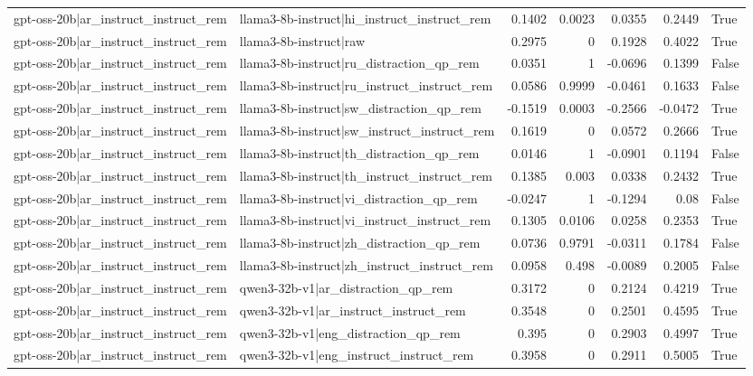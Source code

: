 \begin{table}
\begin{tabular}{l l r r r r l}
gpt-oss-20b|ar_instruct_instruct_rem & llama3-8b-instruct|hi_instruct_instruct_rem & 0.1402 & 0.0023 & 0.0355 & 0.2449 & True \\
gpt-oss-20b|ar_instruct_instruct_rem & llama3-8b-instruct|raw & 0.2975 & 0 & 0.1928 & 0.4022 & True \\
gpt-oss-20b|ar_instruct_instruct_rem & llama3-8b-instruct|ru_distraction_qp_rem & 0.0351 & 1 & -0.0696 & 0.1399 & False \\
gpt-oss-20b|ar_instruct_instruct_rem & llama3-8b-instruct|ru_instruct_instruct_rem & 0.0586 & 0.9999 & -0.0461 & 0.1633 & False \\
gpt-oss-20b|ar_instruct_instruct_rem & llama3-8b-instruct|sw_distraction_qp_rem & -0.1519 & 0.0003 & -0.2566 & -0.0472 & True \\
gpt-oss-20b|ar_instruct_instruct_rem & llama3-8b-instruct|sw_instruct_instruct_rem & 0.1619 & 0 & 0.0572 & 0.2666 & True \\
gpt-oss-20b|ar_instruct_instruct_rem & llama3-8b-instruct|th_distraction_qp_rem & 0.0146 & 1 & -0.0901 & 0.1194 & False \\
gpt-oss-20b|ar_instruct_instruct_rem & llama3-8b-instruct|th_instruct_instruct_rem & 0.1385 & 0.003 & 0.0338 & 0.2432 & True \\
gpt-oss-20b|ar_instruct_instruct_rem & llama3-8b-instruct|vi_distraction_qp_rem & -0.0247 & 1 & -0.1294 & 0.08 & False \\
gpt-oss-20b|ar_instruct_instruct_rem & llama3-8b-instruct|vi_instruct_instruct_rem & 0.1305 & 0.0106 & 0.0258 & 0.2353 & True \\
gpt-oss-20b|ar_instruct_instruct_rem & llama3-8b-instruct|zh_distraction_qp_rem & 0.0736 & 0.9791 & -0.0311 & 0.1784 & False \\
gpt-oss-20b|ar_instruct_instruct_rem & llama3-8b-instruct|zh_instruct_instruct_rem & 0.0958 & 0.498 & -0.0089 & 0.2005 & False \\
gpt-oss-20b|ar_instruct_instruct_rem & qwen3-32b-v1|ar_distraction_qp_rem & 0.3172 & 0 & 0.2124 & 0.4219 & True \\
gpt-oss-20b|ar_instruct_instruct_rem & qwen3-32b-v1|ar_instruct_instruct_rem & 0.3548 & 0 & 0.2501 & 0.4595 & True \\
gpt-oss-20b|ar_instruct_instruct_rem & qwen3-32b-v1|eng_distraction_qp_rem & 0.395 & 0 & 0.2903 & 0.4997 & True \\
gpt-oss-20b|ar_instruct_instruct_rem & qwen3-32b-v1|eng_instruct_instruct_rem & 0.3958 & 0 & 0.2911 & 0.5005 & True \\

\end{tabular}
\end{table}
